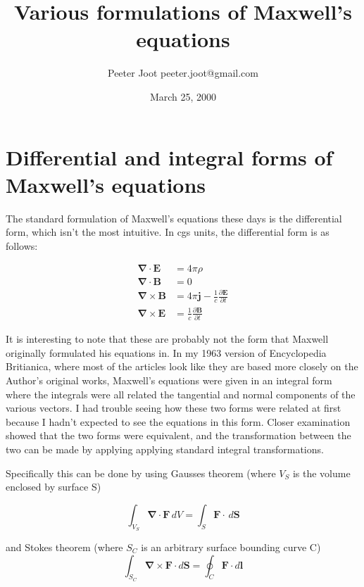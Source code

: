\documentclass{article}      %
\title{Various formulations of Maxwell's equations} %
\author{Peeter Joot \quad peeter.joot@gmail.com}         %
\date{March 25, 2000}        %
\newcommand{\grad}[0]{\boldsymbol{\nabla}}
\newcommand{\curl}[0]{\grad \times}
\newcommand{\diverg}[0]{\grad \cdot}
\newcommand{\D}[2] {\frac {\partial #2} {\partial #1}}
\newcommand{\Bj}[0]{\mathbf{j}}
\newcommand{\BB}[0]{\mathbf{B}}
\newcommand{\BE}[0]{\mathbf{E}}
\newcommand{\BF}[0]{\mathbf{F}}
\newcommand{\BS}[0]{\mathbf{S}}
\begin{document}


\section{Differential and integral forms of Maxwell's equations}

The standard formulation of Maxwell's equations these days is the differential
form, which isn't the most intuitive.  In cgs units, the differential
form is as follows:

\begin{align*}
\diverg \BE &= 4\pi\rho \\
\diverg \BB &= 0 \\
\curl \BB &= 4\pi \Bj - \frac{1}{c} \D{t}{\BE} \\
\curl \BE &= \frac{1}{c} \D{t}{\BB}
\end{align*}

It is interesting to note that these are probably not the form that Maxwell 
originally formulated his equations in.  In my 1963 version of Encyclopedia 
Britianica, where most of the articles look like they are based more closely on the Author's
original works, Maxwell's equations were given in an integral form where the 
integrals were all related the tangential and normal components of the various vectors.  I had 
trouble seeing how these two forms were related at first because I hadn't expected to 
see the equations in this form.  Closer examination showed that the two forms 
were equivalent, and the transformation between the two can be made by applying 
applying standard integral transformations.

Specifically this can be done by using Gausses theorem (where $V_S$ is the volume enclosed by surface S)

\begin{equation*}
\int_{V_S} \diverg \BF\,dV =
\int_S \mathbf{F} \cdot\, d\BS 
\end{equation*}

and Stokes theorem (where $S_C$ is an arbitrary surface bounding curve C)
\begin{equation*}
\int_{S_C} \curl \BF \cdot d\BS = \oint_C \mathbf{F} \cdot d\mathbf{l}
\end{equation*}
\end{document}
